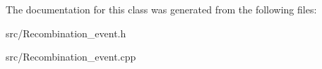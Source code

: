 The documentation for this class was generated from the following files\+:\begin{DoxyCompactItemize}
\item 
src/Recombination\+\_\+event.\+h\item 
src/Recombination\+\_\+event.\+cpp\end{DoxyCompactItemize}
